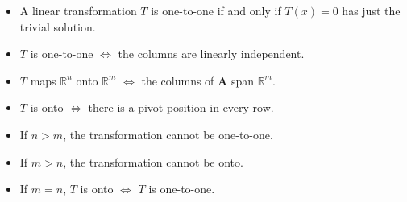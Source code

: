 \documentclass[nobib]{tufte-handout}
\begin{document}
\begin{itemize}
    \item A linear transformation $T$ is one-to-one if and only if $T(x)=0$ has just the
          trivial solution.
    \item $T$ is one-to-one $\iff$ the columns are linearly independent.
    \item $T$ maps $\mathbb{R}^n$ onto $\mathbb{R}^m$ $\iff$ the columns of \textbf{A} span $\mathbb{R}^m$.
    \item $T$ is onto $\iff$ there is a pivot position in every row.
    \item If $n>m$, the transformation cannot be one-to-one.
    \item If $m>n$, the transformation cannot be onto.
    \item If $m=n$, $T$ is onto $\iff$ $T$ is one-to-one.
\end{itemize}
\end{document}
